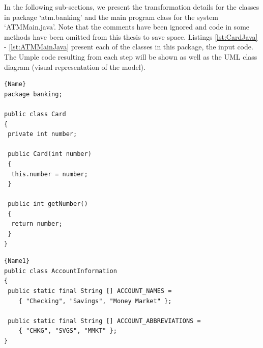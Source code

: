 In the following sub-sections, we present the transformation details for the classes in package `atm.banking' and the main program class for the system `ATMMain.java'. Note that the comments have been ignored and code in some methods have been omitted from this thesis to save space.  Listings \ref{lst:CardJava} - \ref{lst:ATMMainJava} present each of the classes in this package, the input code. The Umple code resulting from each step will be shown as well as the UML class diagram (visual representation of the model). 

\noindent\begin{minipage}{.45\textwidth}
\begin{lstlisting}[style=java,caption=Card.java,label=lst:CardJava]{Name}
package banking;

public class Card
{
 private int number;
    
 public Card(int number)
 {
  this.number = number;
 }
    
 public int getNumber()
 {
  return number;
 }   
}
\end{lstlisting}
\end{minipage}\hfill
\begin{minipage}{.45\textwidth}
\begin{lstlisting}[style=java,caption=AccountInfo.java,label=lst:AccountInformation]{Name1}
public class AccountInformation
{
 public static final String [] ACCOUNT_NAMES =
    { "Checking", "Savings", "Money Market" };
         
 public static final String [] ACCOUNT_ABBREVIATIONS =
    { "CHKG", "SVGS", "MMKT" };
}    
\end{lstlisting}
\end{minipage}


